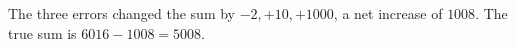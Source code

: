 The three errors changed the sum by $-2,+10,+1000$, a net increase of $1008$. The true sum is $6016-1008=\boxed{5008}$.
